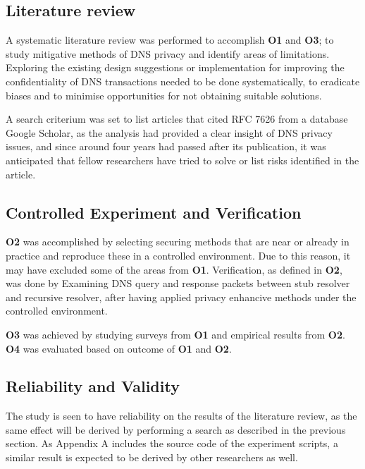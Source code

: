 \documentclass[a4paper,12pt]{article}
\begin{document}
\subsection{Literature review}
A systematic literature review was performed to accomplish \textbf{O1} and \textbf{O3}; to study mitigative methods of DNS privacy and identify areas of limitations.
Exploring the existing design suggestions or implementation for improving the confidentiality of DNS transactions needed to be done systematically, to eradicate biases and to minimise opportunities for not obtaining suitable solutions.

A search criterium was set to list articles that cited RFC 7626 from a database Google Scholar, as the analysis had provided a clear insight of DNS privacy issues\cite{rfc7626}, and since around four years had passed after its publication, it was anticipated that fellow researchers have tried to solve or list risks identified in the article.
\subsection{Controlled Experiment and Verification}
\textbf{O2} was accomplished by selecting securing methods that are near or already in practice and reproduce these in a controlled environment.
Due to this reason, it may have excluded some of the areas from \textbf{O1}. Verification, as defined in \textbf{O2}, was done by Examining DNS query and response packets between stub resolver and recursive resolver, after having applied privacy enhancive methods under the controlled environment.

\textbf{O3} was achieved by studying surveys from \textbf{O1} and empirical results from \textbf{O2}. \textbf{O4} was evaluated based on outcome of \textbf{O1} and \textbf{O2}.

\subsection{Reliability and Validity}
The study is seen to have reliability on the results of the literature review, as the same effect will be derived by performing a search as described in the previous section. As Appendix A includes the source code of the experiment scripts, a similar result is expected to be derived by other researchers as well. 
\end{document}

